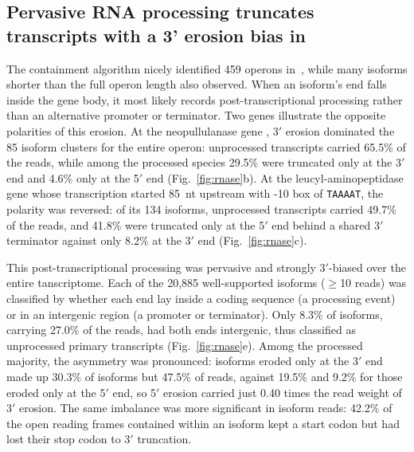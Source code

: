 \subsection{Pervasive RNA processing truncates transcripts with a 3' erosion bias in \syn}

The containment algorithm nicely identified 459 operons in~\syn, while many isoforms shorter than the full operon length also observed. When an isoform's end falls inside the gene body, it most likely records post-transcriptional processing rather than an alternative promoter or terminator.
Two genes illustrate the opposite polarities of this erosion.
At the neopullulanase gene , 3$'$ erosion dominated the 85 isoform clusters for the entire operon: unprocessed transcripts carried 65.5\% of the reads, while among the processed species 29.5\% were truncated only at the 3$'$ end and 4.6\% only at the 5$'$ end (Fig.~\ref{fig:rnase}b).
At the leucyl-aminopeptidase gene  whose transcription started 85~nt upstream with -10 box of \texttt{TAAAAT}, the polarity was reversed: of its 134 isoforms, unprocessed transcripts carried 49.7\% of the reads, and 41.8\% were truncated only at the 5$'$ end behind a shared 3$'$ terminator against only 8.2\% at the 3$'$ end (Fig.~\ref{fig:rnase}c).


This post-transcriptional processing was pervasive and strongly 3$'$-biased over the entire tanscriptome.
Each of the 20{,}885 well-supported isoforms ($\geq$10 reads) was classified by whether each end lay inside a coding sequence (a processing event) or in an intergenic region (a promoter or terminator).
Only 8.3\% of isoforms, carrying 27.0\% of the reads, had both ends intergenic, thus classified as unprocessed primary transcripts (Fig.~\ref{fig:rnase}e).
Among the processed majority, the asymmetry was pronounced: isoforms eroded only at the 3$'$ end made up 30.3\% of isoforms but 47.5\% of reads, against 19.5\% and 9.2\% for those eroded only at the 5$'$ end, so 5$'$ erosion carried just 0.40 times the read weight of 3$'$ erosion.
The same imbalance was more significant in isoform reads: 42.2\% of the open reading frames contained within an isoform kept a start codon but had lost their stop codon to 3$'$ truncation.

